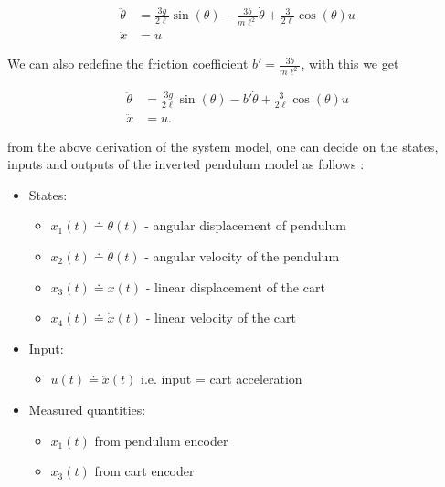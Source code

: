 \begin{equation}
\begin{aligned}
\ddot{\theta} &= \frac{3g}{2\ell} \sin(\theta)    -\frac{3b}{m\ell^2} \dot{\theta}              + \frac{3}{2\ell} \cos(\theta)u\\
\ddot{x} &= u 
\end{aligned}
\end{equation}

We can also redefine the friction coefficient $b'=\frac{3b}{m\ell^2}$, with this we get

\begin{equation}
\begin{aligned}
\ddot{\theta} &= \frac{3g}{2\ell} \sin(\theta)    -b' \dot{\theta}              + \frac{3}{2\ell} \cos(\theta)u\\
\ddot{x} &= u. 
\end{aligned}
\end{equation}

\vspace{0.5cm}

from the above derivation of the system model, one can decide on the states, inputs and outputs of the inverted pendulum model as follows : 

\begin{itemize}
	\item States: 
	\begin{itemize}
		\item $x_1(t) \doteq \theta(t)$  - angular displacement of pendulum
		\item $x_2(t) \doteq \dot{\theta}(t)$ - angular velocity of the pendulum
		\item $x_3(t) \doteq x(t)$    - linear displacement of the cart
		\item $x_4(t) \doteq \dot{x}(t)$ - linear velocity of the cart
	\end{itemize}
	\item Input:
	\begin{itemize}
		\item $u(t) \doteq \ddot{x}(t)$ i.e. input = cart acceleration
	\end{itemize}
	\item Measured quantities: 
	\begin{itemize}
		\item $x_1(t)$ from pendulum encoder
		\item $x_3(t)$ from cart encoder
	\end{itemize}
\end{itemize}


